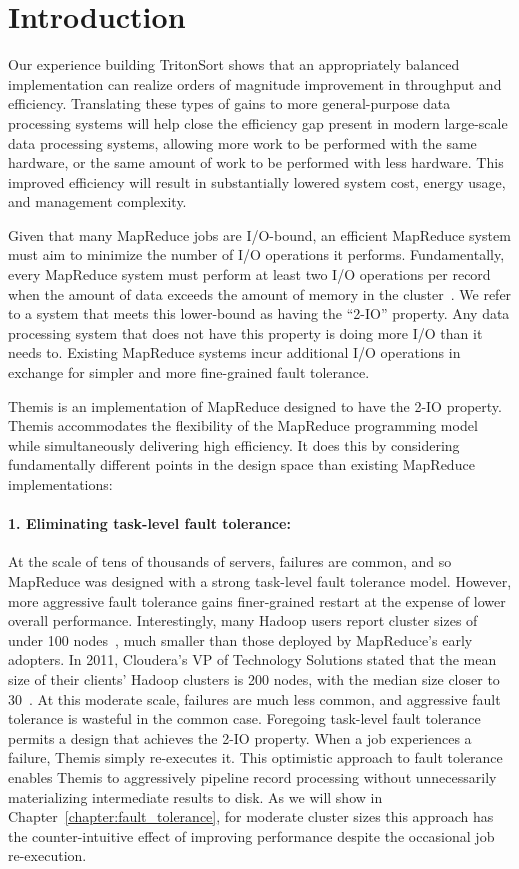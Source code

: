 \section{Introduction}
\label{themis:sec:intro}

Our experience building TritonSort shows that an appropriately balanced
implementation can realize orders of magnitude improvement in throughput and
efficiency.  Translating these types of gains to more general-purpose data
processing systems will help close the efficiency gap present in modern
large-scale data processing systems, allowing more work to be performed with
the same hardware, or the same amount of work to be performed with less
hardware. This improved efficiency will result in substantially lowered system
cost, energy usage, and management complexity.

Given that many MapReduce jobs are I/O-bound, an efficient MapReduce system
must aim to minimize the number of I/O operations it performs.  Fundamentally,
every MapReduce system must perform at least two I/O operations per record when
the amount of data exceeds the amount of memory in the cluster~\cite{sort-io}.
We refer to a system that meets this lower-bound as having the ``2-IO''
property.  Any data processing system that does not have this property is doing
more I/O than it needs to.  Existing MapReduce systems incur additional I/O
operations in exchange for simpler and more fine-grained fault tolerance.

Themis is an implementation of MapReduce designed to have the 2-IO
property. Themis accommodates the flexibility of the MapReduce programming
model while simultaneously delivering high efficiency.  It does this by
considering fundamentally different points in the design space than existing
MapReduce implementations:

\paragraph{1. Eliminating task-level fault tolerance:} At the scale of tens of
thousands of servers, failures are common, and so MapReduce was designed with a
strong task-level fault tolerance model.  However, more aggressive fault
tolerance gains finer-grained restart at the expense of lower overall
performance.  Interestingly, many Hadoop users report cluster sizes of under
100 nodes~\cite{HadoopPoweredBy}, much smaller than those deployed by
MapReduce's early adopters.  In 2011, Cloudera's VP of Technology Solutions
stated that the mean size of their clients' Hadoop clusters is 200 nodes, with
the median size closer to 30~\cite{MonashTrajman}.  At this moderate scale,
failures are much less common, and aggressive fault tolerance is wasteful in
the common case.  Foregoing task-level fault tolerance permits a design that
achieves the 2-IO property.  When a job experiences a failure, Themis simply
re-executes it.  This optimistic approach to fault tolerance enables Themis to
aggressively pipeline record processing without unnecessarily materializing
intermediate results to disk.  As we will show in
Chapter~\ref{chapter:fault_tolerance}, for moderate cluster sizes this approach
has the counter-intuitive effect of improving performance despite the
occasional job re-execution.

